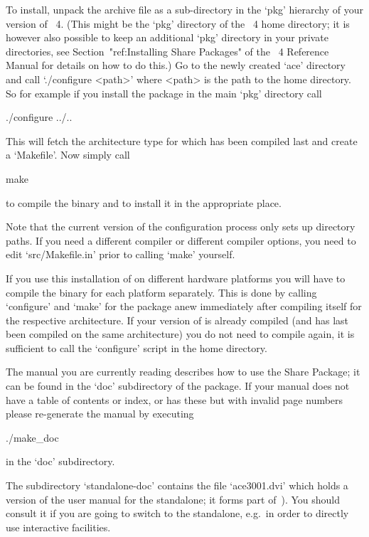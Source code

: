 
To install, unpack the archive file as a sub-directory  in  the  `pkg'
hierarchy of your version  of  {\GAP}~4.  (This  might  be  the  `pkg'
directory of the {\GAP}~4 home directory; it is however also  possible
to keep an additional `pkg' directory in your private directories, see
Section~"ref:Installing Share  Packages"  of  the  {\GAP}~4  Reference
Manual for details on how to do this.) Go to the newly  created  `ace'
directory and call `./configure <path>' where <path> is  the  path  to
the {\GAP} home directory. So for example if you install  the  package
in the main `pkg' directory call

\begintt
./configure ../..
\endtt

This  will fetch  the  architecture  type for  which  {\GAP} has  been
compiled last and create a `Makefile'. Now simply call

\begintt
make
\endtt

to compile the binary and to install it in the appropriate place.

Note that the  current version of the configuration  process only sets
up  directory paths.  If you  need a  different compiler  or different
compiler options, you need  to edit `src/Makefile.in' prior to calling
`make' yourself.

If you use this installation of {\GAP} on different hardware platforms
you will have to compile the binary for each platform separately. This
is  done  by calling  `configure'  and  `make'  for the  package  anew
immediately   after  compiling  {\GAP}   itself  for   the  respective
architecture.  If your version of  {\GAP} is already compiled (and has
last  been compiled  on  the same  architecture)  you do  not need  to
compile {\GAP} again, it is  sufficient to call the `configure' script
in the {\GAP} home directory.

The manual you are currently reading describes how to use  the  {\ACE}
Share Package; it can be  found  in  the  `doc'  subdirectory  of  the
package. If your manual does not have a table of contents or index, or
has these but with invalid page numbers please re-generate the  manual
by executing

\begintt
./make_doc
\endtt

in the `doc' subdirectory.

The  subdirectory  `standalone-doc'  contains the  file  `ace3001.dvi'
which holds a version of the user manual for the {\ACE} standalone; it
forms part of~\cite{Ram99}).  You  should consult it if  you are going
to  switch to  the {\ACE}  standalone, e.g.~in  order to  directly use
interactive facilities.

